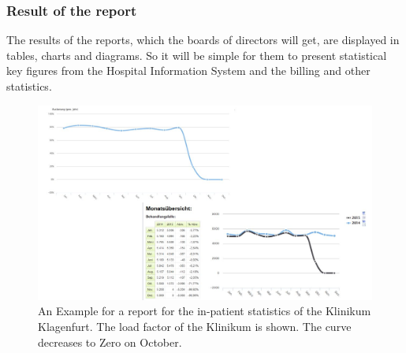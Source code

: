 \documentclass[a4paper]{article}
\begin{document}
	\subsubsection{Result of the report}
	The results of the reports, which the boards of directors will get,
	are displayed in tables, charts and diagrams. So it will be simple for them
	to present statistical key figures from the Hospital Information System and the
	billing and other statistics.
	\begin{figure}[!ht]
		  \centering
		      \includegraphics[width=1.0\textwidth]{reports_results}
		  \caption{An Example for a report for the in-patient statistics of the
		  Klinikum Klagenfurt. The load factor of the Klinikum is shown. The curve decreases to Zero on October.}
	\end{figure}
\end{document}
